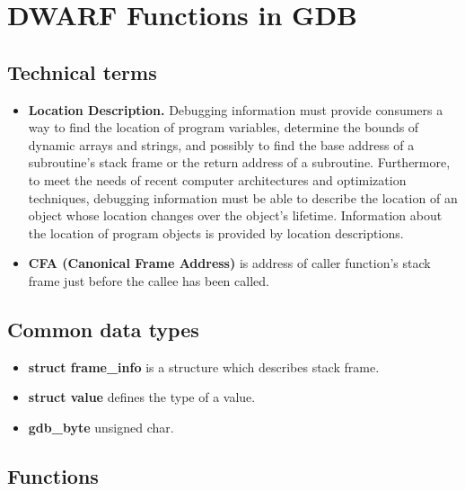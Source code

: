 \documentclass{report}
\begin{document}
\chapter *{DWARF Functions in GDB}
\section *{Technical terms}
\begin{itemize}
	\item \textbf{Location Description.} Debugging information must provide consumers a way to find the location of program
	variables, determine the bounds of dynamic arrays and strings, and possibly to find the
	base address of a subroutine’s stack frame or the return address of a subroutine.
	Furthermore, to meet the needs of recent computer architectures and optimization
	techniques, debugging information must be able to describe the location of an object
	whose location changes over the object’s lifetime. Information about the location of program objects is provided by location descriptions.
	\item \textbf{CFA (Canonical Frame Address)} is address of caller function's stack frame just before the callee has been called.
	
\end{itemize}
\section *{Common data types}
\begin{itemize}
	\item \textbf{struct frame\_info} is a structure which describes stack frame. 
	\item \textbf{struct value} defines the type of a value.
	\item \textbf{gdb\_byte} unsigned char.
\end{itemize}

\section *{Functions}
\inputminted{c}{important_gdb_functions.c}	
\end{document}
